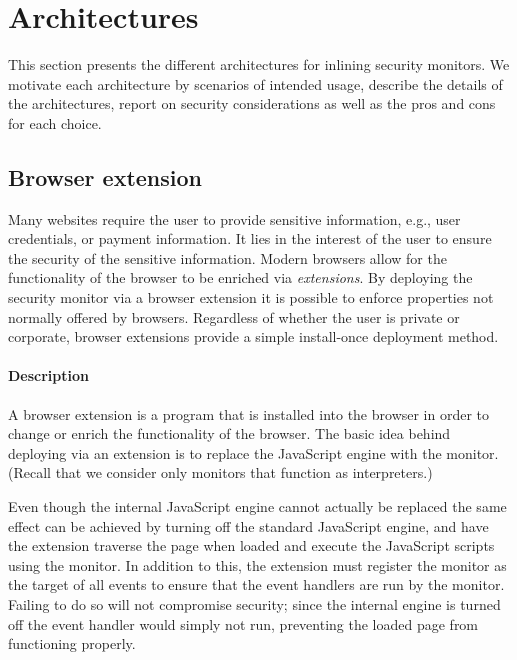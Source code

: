 \documentclass{llncs}
\begin{document}


\section{Architectures}
\label{sec:arch}

This section presents the different architectures for inlining
security monitors. We motivate each architecture by scenarios of
intended usage, describe the details of the architectures, report on
security considerations as well as the pros and cons for each choice.




\subsection{Browser extension}

Many websites require the user to provide sensitive information, e.g., user
credentials, or payment information. It lies in the interest of the user to
ensure the security of the sensitive information.  Modern browsers allow for
the functionality of the browser to be enriched via \emph{extensions}. By
deploying the security monitor via a browser extension it is possible to enforce
properties not normally offered by browsers.  Regardless of whether the user is
private or corporate, browser extensions provide a simple 
install-once deployment method.


\paragraph{Description}

A browser extension is a program that is installed into the browser in order to
change or enrich the functionality of the browser.  The basic idea behind
deploying via an extension is to replace the JavaScript engine with the monitor.
(Recall that we consider only monitors that function as interpreters.)

Even though the internal JavaScript engine cannot actually be replaced the same
effect can be achieved by turning off the standard JavaScript engine, and have
the extension traverse the page when loaded and execute the JavaScript scripts
using the monitor. 
In addition to this, the extension must register the monitor as the target of
all events to ensure that the event handlers are run by the monitor. Failing to
do so will not compromise security; since the internal engine is turned off
the event handler would simply not run, preventing the loaded page from functioning
properly.
\end{document}
